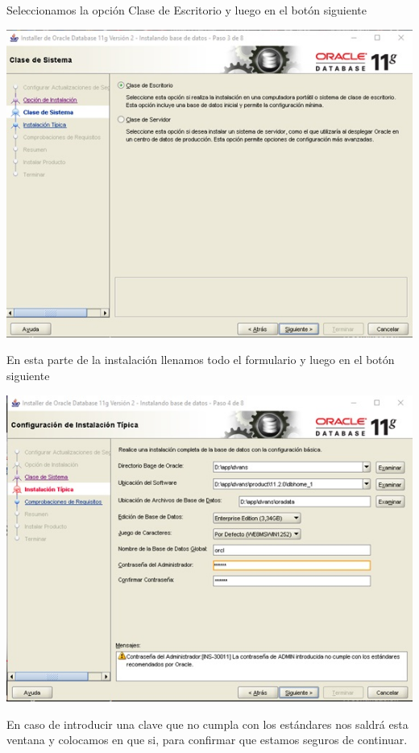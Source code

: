 \begin{flushleft}
Seleccionamos la opción Clase de Escritorio y luego en el botón siguiente\\
\begin{center}
\includegraphics{images/image-08}\\
\end{center}
En esta parte de la instalación llenamos todo el formulario y luego en el botón siguiente\\
\begin{center}
\includegraphics{images/image-09}\\
\end{center}
En caso de introducir una clave que no cumpla con los estándares nos saldrá esta ventana y colocamos en que si, para confirmar que estamos seguros de continuar.\\

\end{flushleft}
